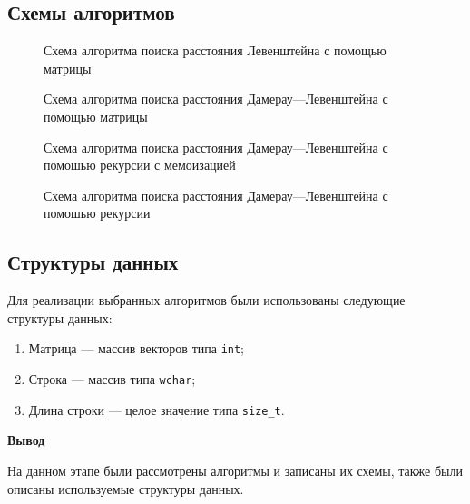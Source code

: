 \subsection{Схемы алгоритмов}
\begin{figure}[H]
	\centering
	
	
	\caption{Схема алгоритма поиска расстояния Левенштейна с помощью матрицы}
	\label{fig:leb_algo_matrix}
\end{figure}

\begin{figure}[H]
	\centering
	
	
	\caption{Схема алгоритма поиска расстояния Дамерау---Левенштейна с помощью матрицы}
	\label{fig:dam_algo_matrix}
\end{figure}

\begin{figure}[H]
	\centering
	
	\caption{Схема алгоритма поиска расстояния Дамерау---Левенштейна с помошью рекурсии с мемоизацией}
	\label{fig:dam_algo_rec_mem}
\end{figure}

\begin{figure}[H]
	\centering
	
	\caption{Схема алгоритма поиска расстояния Дамерау---Левенштейна с помошью рекурсии}
	\label{fig:dam_algo_rec}
\end{figure}


\subsection{Структуры данных}
Для реализации выбранных алгоритмов были использованы следующие структуры данных:
\begin{enumerate}
	\item Матрица --- массив векторов типа \texttt{int};
	\item Строка --- массив типа \texttt{wchar};
	\item Длина строки --- целое значение типа \texttt{size\_t}.
\end{enumerate}


\textbf{Вывод}

На данном этапе были рассмотрены алгоритмы и записаны их схемы, также были описаны используемые структуры данных.







